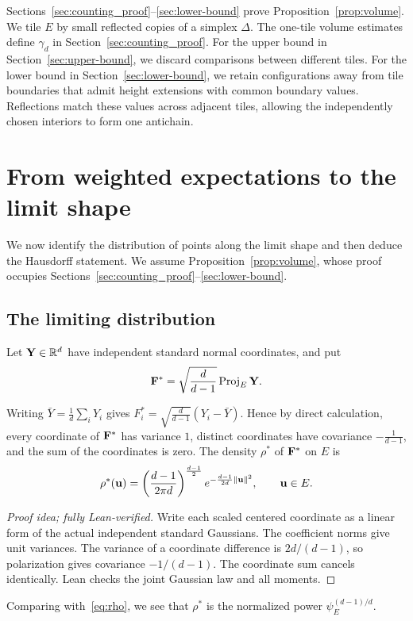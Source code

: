 \documentclass[11pt,letterpaper]{article}
\begin{document}
Sections~\ref{sec:counting_proof}--\ref{sec:lower-bound} prove Proposition~\ref{prop:volume}. We tile $E$ by small reflected copies of a simplex $\Delta$. The one-tile volume estimates define $\gamma_d$ in Section~\ref{sec:counting_proof}. For the upper bound in Section~\ref{sec:upper-bound}, we discard comparisons between different tiles. For the lower bound in Section~\ref{sec:lower-bound}, we retain configurations away from tile boundaries that admit height extensions with common boundary values. Reflections match these values across adjacent tiles, allowing the independently chosen interiors to form one antichain.

\section{From weighted expectations to the limit shape}\label{sec:shortcuts}

We now identify the distribution of points along the limit shape and then deduce the Hausdorff statement. We assume Proposition~\ref{prop:volume}, whose proof occupies Sections~\ref{sec:counting_proof}--\ref{sec:lower-bound}.

\subsection{The limiting distribution}


Let $\mathbf Y\in\mathbb R^d$ have independent standard normal coordinates, and put
\begin{equation}\label{eq:Fstar_definition}
      \mathbf F^\ast=\sqrt{\frac d{d-1}}\operatorname{Proj}_E\mathbf Y.
\end{equation}

Writing $\bar Y=\frac1d\sum_iY_i$ gives $F_i^\ast=\sqrt{\frac{d}{d-1}}(Y_i-\bar Y)$. Hence by direct calculation, every coordinate of $\mathbf F^\ast$ has variance $1$, distinct coordinates have covariance $-\frac1{d-1}$, and the sum of the coordinates is zero. The density $\rho^\ast$ of $\mathbf F^\ast$ on $E$ is
\begin{equation}\label{eq:rho-star}
      \rho^\ast(\mathbf u)=\left(\frac{d-1}{2\pi d}\right)^{\frac{d-1}{2}}
      e^{-\frac{d-1}{2d}\|\mathbf u\|^2},\qquad \mathbf u\in E.
\end{equation}

\begin{proof}[Proof idea; fully Lean-verified]
Write each scaled centered coordinate as a linear form of the actual independent standard Gaussians. The coefficient norms give unit variances. The variance of a coordinate difference is $2d/(d-1)$, so polarization gives covariance $-1/(d-1)$. The coordinate sum cancels identically. Lean checks the joint Gaussian law and all moments.
\end{proof}
Comparing with~\eqref{eq:rho}, we see that $\rho^\ast$ is the normalized power $\psi_E^{(d-1)/d}$.
\end{document}
